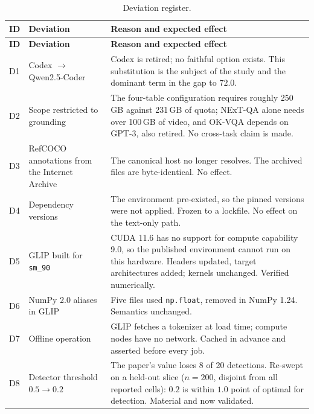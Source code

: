 \documentclass[12pt,a4paper,oneside]{report}
\begin{document}
\begin{longtable}{@{}p{}p{}p{}@{}}
\caption{Deviation register.}\label{tab:deviations}\\
\toprule
\textbf{ID} & \textbf{Deviation} & \textbf{Reason and expected effect} \\
\midrule
\endfirsthead
\toprule
\textbf{ID} & \textbf{Deviation} & \textbf{Reason and expected effect} \\
\midrule
\endhead
\bottomrule
\endfoot

D1 & Codex $\to$ Qwen2.5-Coder & Codex is retired; no faithful option exists. This
substitution is the subject of the study and the dominant term in the gap to $72.0$. \\

D2 & Scope restricted to grounding & The four-table configuration requires roughly
250\,GB against 231\,GB of quota; NExT-QA alone needs over 100\,GB of video, and OK-VQA
depends on GPT-3, also retired. No cross-task claim is made. \\

D3 & RefCOCO annotations from the Internet Archive & The canonical host no longer
resolves. The archived files are byte-identical. No effect. \\

D4 & Dependency versions & The environment pre-existed, so the pinned versions were not
applied. Frozen to a lockfile. No effect on the text-only path. \\

D5 & GLIP built for \texttt{sm\_90} & CUDA 11.6 has no support for compute capability
9.0, so the published environment cannot run on this hardware. Headers updated, target
architectures added; kernels unchanged. Verified numerically. \\

D6 & NumPy 2.0 aliases in GLIP & Five files used \texttt{np.float}, removed in NumPy
1.24. Semantics unchanged. \\

D7 & Offline operation & GLIP fetches a tokenizer at load time; compute nodes have no
network. Cached in advance and asserted before every job. \\

D8 & Detector threshold $0.5 \to 0.2$ & The paper's value loses 8 of 20 detections.
Re-swept on a held-out slice ($n{=}200$, disjoint from all reported cells): $0.2$ is
within $1.0$ point of optimal for detection. Material and now validated. \\


\end{longtable}
\end{document}
